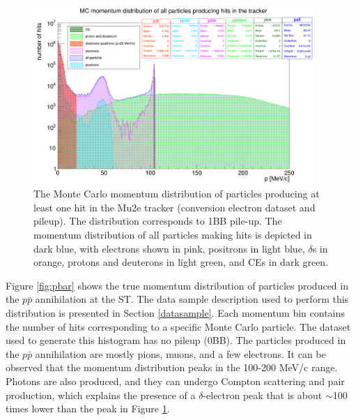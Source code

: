 \begin{figure}[!h]
        \centering
        \includegraphics[width =0.95\textwidth]{figures/png/Screenshot_20240812_152905.png}
    \caption[Monte Carlo momentum distribution of particles producing hits in the Mu2e tracker (conversion electron dataset and pileup).]{
       The Monte Carlo momentum distribution of particles producing at 
       least one hit in the Mu2e tracker (conversion electron dataset and pileup). The distribution
       corresponds to 1BB pile-up. The momentum distribution 
       of all particles making hits is depicted in dark blue, with electrons 
       shown in pink, positrons in light blue, $\delta$s in orange, protons and deuterons in 
       light green, and CEs in dark green. }
       \label{fig:momhits}
\end{figure}


Figure \ref{fig:pbar} shows the true momentum distribution of 
particles produced in the $p\bar{p}$ annihilation at the ST. 
The data sample description used to perform this distribution 
is presented in Section \ref{datasample}.
Each momentum bin contains the number of hits corresponding 
to a specific Monte Carlo particle. The dataset used to generate 
this histogram has no pileup (0BB). 
The particles produced in the $p\bar{p}$ annihilation 
are mostly pions, muons, and a few electrons. 
It can be observed that the momentum distribution 
peaks in the 100-200 MeV/c range. Photons are also 
produced, and they can undergo Compton scattering and 
pair production, which explains the presence of a 
$\delta$-electron peak that is about $\sim$100 
times lower than the peak in Figure \ref{fig:momhits}.

